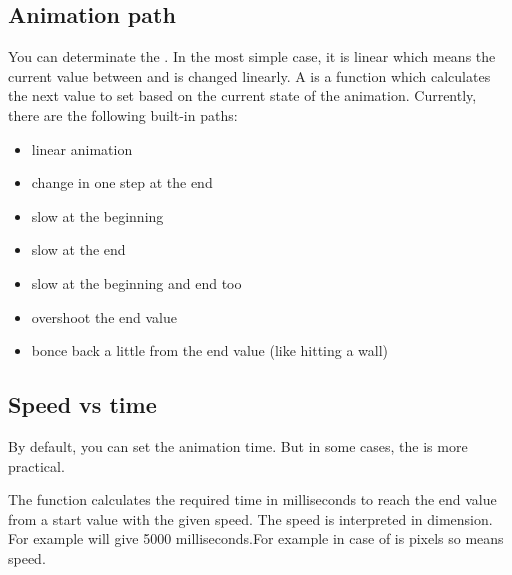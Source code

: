 \documentclass[letterpaper,10pt,english]{sphinxmanual}
\begin{document}
\subsection{Animation path}
\label{\detokenize{overview/animations:animation-path}}
You can determinate the . In the most simple case, it is linear which means the current value between  and   is changed linearly.
A  is a function which calculates the next value to set based on the current state of the animation. Currently, there are the following built-in paths:
\begin{itemize}
\item {} 
 linear animation

\item {} 
 change in one step at the end

\item {} 
 slow at the beginning

\item {} 
 slow at the end

\item {} 
 slow at the beginning and end too

\item {} 
 overshoot the end value

\item {} 
 bonce back a little from the end value (like hitting a wall)

\end{itemize}


\subsection{Speed vs time}
\label{\detokenize{overview/animations:speed-vs-time}}
By default, you can set the animation time. But in some cases, the  is more practical.

The  function calculates the required time in milliseconds to reach the end value from a start value with the given speed.
The speed is interpreted in  dimension. For example  will give 5000 milliseconds.For example in case of   is pixels so  means  speed.
\end{document}
